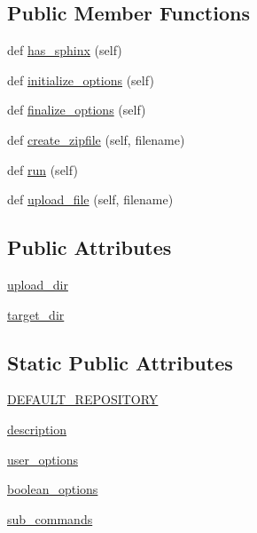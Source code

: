\subsection*{Public Member Functions}
\begin{DoxyCompactItemize}
\item 
def \hyperlink{classsetuptools_1_1command_1_1upload__docs_1_1upload__docs_a0528a4c1dba343caf760a1f367028d8e}{has\+\_\+sphinx} (self)
\item 
def \hyperlink{classsetuptools_1_1command_1_1upload__docs_1_1upload__docs_a2f63bded4d91b7eb5c9dc81948ebf223}{initialize\+\_\+options} (self)
\item 
def \hyperlink{classsetuptools_1_1command_1_1upload__docs_1_1upload__docs_a2f93575b3f6bd2e6bacacf184b8ab39e}{finalize\+\_\+options} (self)
\item 
def \hyperlink{classsetuptools_1_1command_1_1upload__docs_1_1upload__docs_ab3f3f728f7f90d6e4ff47f2633575ef0}{create\+\_\+zipfile} (self, filename)
\item 
def \hyperlink{classsetuptools_1_1command_1_1upload__docs_1_1upload__docs_a68a4acfc4c983b959a33ef16a9c00f1b}{run} (self)
\item 
def \hyperlink{classsetuptools_1_1command_1_1upload__docs_1_1upload__docs_ac346b23de37dcf9fbaa40c548f68321c}{upload\+\_\+file} (self, filename)
\end{DoxyCompactItemize}
\subsection*{Public Attributes}
\begin{DoxyCompactItemize}
\item 
\hyperlink{classsetuptools_1_1command_1_1upload__docs_1_1upload__docs_ae351d8d8b61208a3bb38774ba56d99c1}{upload\+\_\+dir}
\item 
\hyperlink{classsetuptools_1_1command_1_1upload__docs_1_1upload__docs_a3e5f02483c643f4c7fec04ee49eb5d08}{target\+\_\+dir}
\end{DoxyCompactItemize}
\subsection*{Static Public Attributes}
\begin{DoxyCompactItemize}
\item 
\hyperlink{classsetuptools_1_1command_1_1upload__docs_1_1upload__docs_a149ce25f0132b11c4d4bb1e29e605a45}{D\+E\+F\+A\+U\+L\+T\+\_\+\+R\+E\+P\+O\+S\+I\+T\+O\+RY}
\item 
\hyperlink{classsetuptools_1_1command_1_1upload__docs_1_1upload__docs_aafa137b3ec2bc84928352e4df1cd90d3}{description}
\item 
\hyperlink{classsetuptools_1_1command_1_1upload__docs_1_1upload__docs_abacc6dfad6f5e4dfa9c2e29dca2182a3}{user\+\_\+options}
\item 
\hyperlink{classsetuptools_1_1command_1_1upload__docs_1_1upload__docs_a1efabf142789be7ad52a639b3fec1a96}{boolean\+\_\+options}
\item 
\hyperlink{classsetuptools_1_1command_1_1upload__docs_1_1upload__docs_a1181aff8d36ec61815285c4061f5c9bf}{sub\+\_\+commands}
\end{DoxyCompactItemize}


